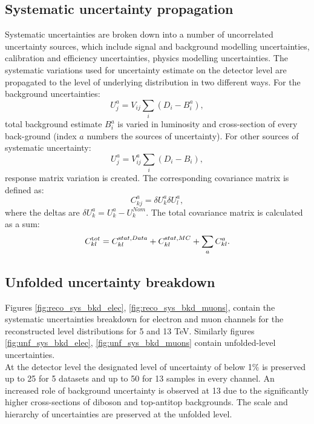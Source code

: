 \subsection{Systematic uncertainty propagation}
Systematic uncertainties are broken down into a number of uncorrelated uncertainty sources, which include signal and background modelling uncertainties, calibration and efficiency uncertainties, physics modelling uncertainties. The systematic variations used for uncertainty estimate on the detector level are propagated to the level of underlying distribution in two different ways. For the background uncertainties:
 \begin{equation*}
U_j^{a} = V_{ij}\sum_{i} (D_i - B^a_i),
\end{equation*}
total background estimate $B^a_i$ is varied in luminosity and cross-section of every back-ground (index $a$ numbers the sources of uncertainty). For other sources of systematic uncertainty:
 \begin{equation*}
U_j^{a} = V_{ij}^a \sum_{i} (D_i - B_i),
\end{equation*}
response matrix variation is created. The corresponding covariance matrix is defined as:
 \begin{equation*}
C_{kj}^{a} = \delta U^a_k \delta U^a_l,
\end{equation*}
where the deltas are $\delta U^a_k=U^a_k-U^{Nom}_k$.
The total covariance matrix is calculated as a sum:
\begin{equation}
C_{kl}^{\textrm tot} = C_{kl}^{\textrm stat,Data} + C_{kl}^{\textrm stat,MC} + \sum_a C_{kl}^a.
\end{equation}	
\subsection{Unfolded uncertainty breakdown}
Figures \ref{fig:reco_sys_bkd_elec}, \ref{fig:reco_sys_bkd_muons}, contain the systematic uncertainties breakdown for electron and muon channels for the reconstructed level distributions for 5 and 13 TeV. Similarly figures \ref{fig:unf_sys_bkd_elec}, \ref{fig:unf_sys_bkd_muons} contain unfolded-level uncertainties. \\
At the detector level the designated level of uncertainty of below 1\% is preserved up to 25 \gev{} for 5 \tev{} datasets and up to 50 \gev{} for 13 \tev{} samples in every channel. An increased role of background uncertainty is observed at 13 \tev{} due to the significantly higher cross-sections of diboson and top-antitop backgrounds.
The scale and hierarchy of uncertainties are preserved at the unfolded level. 

